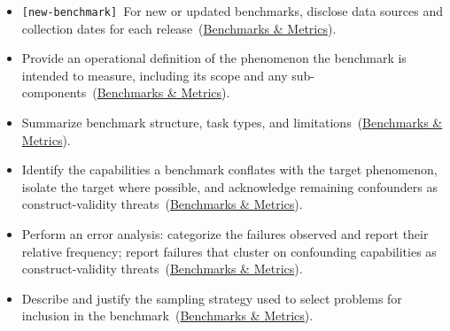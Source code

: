 \documentclass[smallextended]{svjour3}
\makeatletter
\newcommand{\must}{\textbf{must}\xspace}
\newcommand{\should}{\textbf{should}\xspace}
\newcommand{\iconM}{\usebox{\iconMbox}\xspace}
\newcommand{\iconS}{\usebox{\iconSbox}\xspace}
\newcommand{\iconM}{●\xspace}
\newcommand{\iconS}{○\xspace}
\newcommand{\condition}[1]{\texttt{\small[#1]}\,}
\newcommand{\condition}[1]{@@cond:#1@@}
\newcommand{\refbenchmarks}{\hyperref[sec:use-suitable-baselines-benchmarks-and-metrics]{Benchmarks \& Metrics}}
\newcommand{\refbenchmarks}{\href{/guidelines/benchmarks-metrics/}{Benchmarks \& Metrics}}
\makeatother
\begin{document}
\begin{appendices}
\begin{itemize}[label={},leftmargin=*]
    \item \iconM \condition{new-benchmark} For new or updated benchmarks, disclose data sources and collection dates for each release~(\refbenchmarks).
    \item \iconS Provide an operational definition of the phenomenon the benchmark is intended to measure, including its scope and any sub-components~(\refbenchmarks).
    \item \iconS Summarize benchmark structure, task types, and limitations~(\refbenchmarks).
    \item \iconS Identify the capabilities a benchmark conflates with the target phenomenon, isolate the target where possible, and acknowledge remaining confounders as construct-validity threats~(\refbenchmarks).
    \item \iconS Perform an error analysis: categorize the failures observed and report their relative frequency; report failures that cluster on confounding capabilities as construct-validity threats~(\refbenchmarks).
    \item \iconS Describe and justify the sampling strategy used to select problems for inclusion in the benchmark~(\refbenchmarks).

\end{itemize}
\end{appendices}
\end{document}
